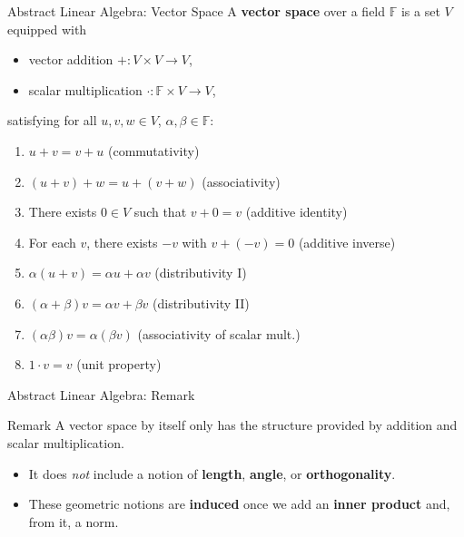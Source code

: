 \blueheader
\begin{frame}{Abstract Linear Algebra: Vector Space}
A \textbf{vector space} over a field $\mathbb{F}$ is a set $V$ equipped with
\begin{itemize}
    \item vector addition $+: V \times V \to V$,
    \item scalar multiplication $\cdot: \mathbb{F} \times V \to V$,
\end{itemize}
satisfying for all $u,v,w \in V$, $\alpha,\beta \in \mathbb{F}$:
\begin{enumerate}
    \item $u+v = v+u$ \hfill (commutativity)
    \item $(u+v)+w = u+(v+w)$ \hfill (associativity)
    \item There exists $0 \in V$ such that $v+0=v$ \hfill (additive identity)
    \item For each $v$, there exists $-v$ with $v+(-v)=0$ \hfill (additive inverse)
    \item $\alpha(u+v) = \alpha u + \alpha v$ \hfill (distributivity I)
    \item $(\alpha+\beta) v = \alpha v + \beta v$ \hfill (distributivity II)
    \item $(\alpha\beta)v = \alpha(\beta v)$ \hfill (associativity of scalar mult.)
    \item $1 \cdot v = v$ \hfill (unit property)
\end{enumerate}

\end{frame}

\redheader
\begin{frame}{Abstract Linear Algebra: Remark}
\begin{red*}{Remark}
A vector space by itself only has the structure provided by addition and scalar multiplication.

\medskip
\begin{itemize}
    \item It does \emph{not} include a notion of \textbf{length}, \textbf{angle}, or \textbf{orthogonality}.
    \item These geometric notions are \textbf{induced} once we add an \textbf{inner product} and, from it, a norm.
\end{itemize}
\end{red*}
\end{frame}

